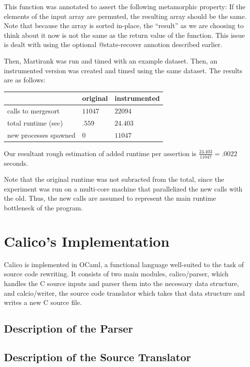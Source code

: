 \documentclass[notitlepage]{article}
\begin{document}
This function was annotated to assert the following metamorphic property: If the elements of the input array are permuted, the resulting array should be the same. Note that because the array is sorted in-place, the ``result'' as we are choosing to think about it now is not the same as the return value of the function. This issue is dealt with using the optional \ttfamily @state-recover \rmfamily annotion described earlier.

Then, Martirank was run and timed with an example dataset. Then, an instrumented version was created and timed using the same dataset. The results are as follows:

\begin{tabular}{l | l | l}
& original & instrumented \\ \hline
calls to mergesort & $11047$ & $22094$ \\
total runtime (sec) & $.559$ & $24.403$ \\
new processes spawned & 0 & $11047$
\end{tabular}

Our resultant rough estimation of added runtime per assertion is $\frac{24.403}{11047} = {\mathbf .0022}$ seconds.

Note that the original runtime was not subracted from the total, since the experiment was run on a multi-core machine that parallelized the new calls with the old. Thus, the new calls are assumed to represent the main runtime bottleneck of the program.

\section{Calico's Implementation}

Calico is implemented in OCaml, a functional language well-suited to the task of source code rewriting. It consists of two main modules, calico/parser, which handles the C source inputs and parser them into the necessary data structure, and calcio/writer, the source code translator which takes that data structure and writes a new C source file.

\subsection{Description of the Parser}

\subsection{Description of the Source Translator}
\end{document}
